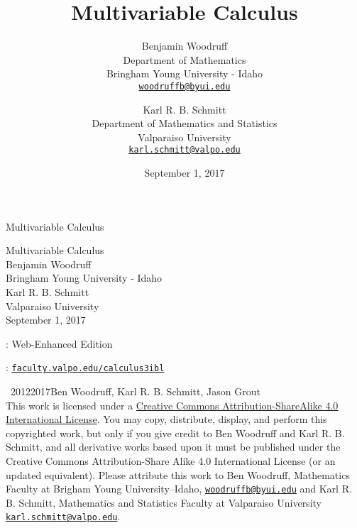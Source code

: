 \documentclass[10pt,]{book}
\title{Multivariable Calculus}
\author{Benjamin Woodruff\\
Department of Mathematics\\
Bringham Young University - Idaho\\
\href{mailto:woodruffb@byui.edu}{\nolinkurl{woodruffb@byui.edu}}
\and
Karl R. B. Schmitt\\
Department of Mathematics and Statistics \\
Valparaiso University\\
\href{mailto:karl.schmitt@valpo.edu}{\nolinkurl{karl.schmitt@valpo.edu}}
}
\date{September 1, 2017}
\theoremstyle{plain}
\theoremstyle{definition}
\theoremstyle{definition}
\theoremstyle{definition}
\theoremstyle{definition}
\theoremstyle{definition}
\numberwithin{equation}{section}
\begin{document}
\frontmatter
\thispagestyle{empty}
{\centering
\vspace*{0.28\textheight}
{\Huge Multivariable Calculus}\\}
\clearpage
\thispagestyle{empty}
\null%
\clearpage
\thispagestyle{empty}
{\centering
\vspace*{0.14\textheight}
{\Huge Multivariable Calculus}\\[3\baselineskip]
{\Large Benjamin Woodruff}\\[0.5\baselineskip]
{\Large Bringham Young University - Idaho}\\[3\baselineskip]
{\Large Karl R. B. Schmitt}\\[0.5\baselineskip]
{\Large Valparaiso University}\\[3\baselineskip]
{\Large September 1, 2017}\\}
\clearpage
\thispagestyle{empty}
: Web-Enhanced Edition\par\medskip
{}: \href{http://faculty.valpo.edu/calculus3ibl}{\lstinline?faculty.valpo.edu/calculus3ibl?}\par\medskip
\noindent\textcopyright\ 2012\textendash{}2017\quad{}Ben Woodruff, Karl R. B. Schmitt, Jason Grout\\[0.5\baselineskip]
 This work is licensed under a \href{http://creativecommons.org/licenses/by-sa/4.0/}{Creative Commons Attribution-ShareAlike 4.0 International License}. You may copy, distribute, display, and perform this copyrighted work, but only if you give credit to Ben Woodruff and Karl R. B. Schmitt, and all derivative works based upon it must be published under the Creative Commons Attribution-Share Alike 4.0 International License (or an updated equivalent). Please attribute this work to Ben Woodruff, Mathematics Faculty at Brigham Young University--Idaho, \href{mailto:woodruffb@byui.edu}{\nolinkurl{woodruffb@byui.edu}} and Karl R. B. Schmitt, Mathematics and Statistics Faculty at Valparaiso University \href{mailto:karl.schmitt@valpo.edu}{\nolinkurl{karl.schmitt@valpo.edu}}.\par\medskip
{}
\null\clearpage
\end{document}
